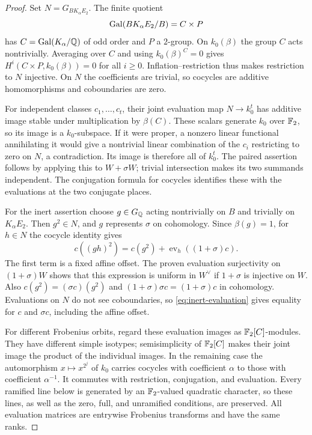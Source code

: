 \begin{proof}
Set $N=G_{B K_\alpha E_2}$.  The finite quotient
\[
 \operatorname{Gal}(B K_\alpha E_2/B)=C\times P
\]
has $C=\operatorname{Gal}(K_\alpha/\mathbb Q)$ of odd order and $P$ a $2$-group.
On $k_0(\beta)$ the group $C$ acts nontrivially.  Averaging over $C$
and using $k_0(\beta)^C=0$ gives
$H^i(C\times P,k_0(\beta))=0$ for all $i\ge0$.
Inflation--restriction thus makes restriction to $N$ injective.
On $N$ the coefficients are trivial, so cocycles are additive
homomorphisms and coboundaries are zero.

For independent classes $c_1,\ldots,c_t$, their joint evaluation map
$N\to k_0^t$ has additive image stable under multiplication by
$\beta(C)$.  These scalars generate $k_0$ over $\mathbb F_2$, so its
image is a $k_0$-subspace.  If it were proper, a nonzero linear
functional annihilating it would give a nontrivial linear combination
of the $c_i$ restricting to zero on $N$, a contradiction.  Its image
is therefore all of $k_0^t$.  The paired assertion follows by applying
this to $W+\sigma W$; trivial intersection makes its two summands
independent.  The conjugation formula for cocycles identifies these
with the evaluations at the two conjugate places.

For the inert assertion choose $g\in G_{\mathbb Q}$ acting nontrivially
on $B$ and trivially on $K_\alpha E_2$.  Then $g^2\in N$, and
$g$ represents $\sigma$ on cohomology.  Since $\beta(g)=1$, for
$h\in N$ the cocycle identity gives
\begin{equation}\label{eq:inert-evaluation}
 c((gh)^2)=c(g^2)+\operatorname{ev}_h((1+\sigma)c).
\end{equation}
The first term is a fixed affine offset.  The proven evaluation
surjectivity on $(1+\sigma)W$ shows that this expression is uniform
in $W^\vee$ if $1+\sigma$ is injective on $W$.  Also
$c(g^2)=(\sigma c)(g^2)$ and
$(1+\sigma)\sigma c=(1+\sigma)c$ in cohomology.  Evaluations on
$N$ do not see coboundaries, so \eqref{eq:inert-evaluation} gives
equality for $c$ and $\sigma c$, including the affine offset.

For different Frobenius orbits, regard these evaluation images as
$\mathbb F_2[C]$-modules.  They have different simple isotypes; semisimplicity
of $\mathbb F_2[C]$ makes their joint image the product of the individual
images.  In the remaining case the automorphism $x\mapsto x^{2^j}$
of $k_0$ carries cocycles with coefficient $\alpha$ to those with
coefficient $\alpha^{-1}$.  It commutes with restriction,
conjugation, and evaluation.  Every ramified line below is generated
by an $\mathbb F_2$-valued quadratic character, so these lines, as well as
the zero, full, and unramified conditions, are preserved.  All
evaluation matrices are entrywise Frobenius transforms and have the
same ranks.


\end{proof}
